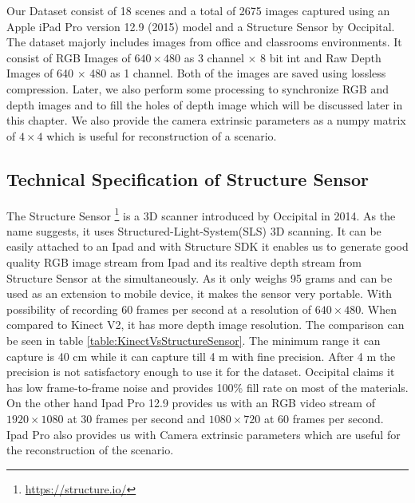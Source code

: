 Our Dataset consist of 18 scenes and a total of 2675 images captured using an Apple iPad Pro version 12.9 (2015) model and a Structure Sensor by Occipital. The dataset majorly includes images from office and classrooms environments. It consist of RGB Images of $640\times480$ as 3 channel $\times$ 8 bit int and Raw Depth Images of 640 $\times$ 480 as 1 channel. Both of the images are saved using lossless compression. Later, we also perform some processing to synchronize RGB and depth images and to fill the holes of depth image which will be discussed later in this chapter. We also provide the camera extrinsic parameters as a numpy matrix of $4\times4$ which is useful for reconstruction of a scenario.\\


\subsection{Technical Specification of Structure Sensor}
The Structure Sensor \footnote{\url{https://structure.io/}} is a 3D scanner introduced by Occipital in 2014. As the name suggests, it uses Structured-Light-System(SLS) 3D scanning\cite{Kalantari}. It can be easily attached to an Ipad and with Structure SDK it enables us to generate good quality RGB image stream from Ipad and its realtive depth stream from Structure Sensor at the simultaneously. As it only weighs 95 grams and can be used as an extension to mobile device, it makes the sensor very portable. With possibility of recording 60 frames per second at a resolution of $640\times480$\cite{Kalantari}. When compared to Kinect V2, it has more depth image resolution. The comparison can be seen in table \ref{table:KinectVsStructureSensor}. The minimum range it can capture is 40 cm while it can capture till 4 m with fine precision. After 4 m the precision is not satisfactory enough to use it for the dataset. Occipital claims it has low frame-to-frame noise and provides 100\% fill rate on most of the materials. On the other hand Ipad Pro 12.9 provides us with an RGB video stream of $1920\times1080$ at 30 frames per second and $1080\times720$ at 60 frames per second. Ipad Pro also provides us with Camera extrinsic parameters which are useful for the reconstruction of the scenario.\\

